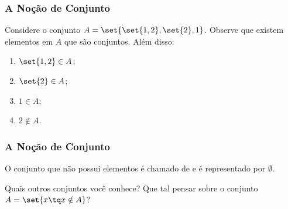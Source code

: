 \begin{frame}
    \frametitle{A Noção de Conjunto}
    
    \begin{Exem}
        Considere o conjunto $A = \set{\set{1, 2}, \set{2}, 1 }$. Observe que existem elementos em $A$ que são conjuntos. Além disso:
        \begin{enumerate}
            \item $\set{1, 2} \in A$;
            \item $\set{2} \in A$;
            \item $1 \in A$;
            \item $2 \notin A$.
        \end{enumerate}
    \end{Exem}
\end{frame}


\begin{frame}
    \frametitle{A Noção de Conjunto}

    \begin{Def}
        O conjunto que não possui elementos é chamado de  e é representado por $\emptyset$.
    \end{Def}

    \begin{Exem}
        Quais outros conjuntos você conhece? Que tal pensar sobre o conjunto $ A = \set{ x \tq x \notin A} $?
    \end{Exem}
\end{frame}
